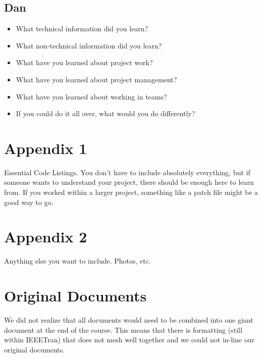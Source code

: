 \documentclass[compsoc,draftclsnofoot,onecolumn,10pt]{IEEEtran}
\begin{document}
\subsection{Dan}
\begin{itemize}
    \item What technical information did you learn?
    \item What non-technical information did you learn?
    \item What have you learned about project work?
    \item What have you learned about project management?
    \item What have you learned about working in teams?
    \item If you could do it all over, what would you do differently?
\end{itemize}

\section{Appendix 1}
Essential Code Listings. You don't have to include absolutely everything, but if someone wants to understand your project, there should be enough here to learn from. If you worked within a larger project, something like a patch file might be a good way to go.

\section{Appendix 2}
Anything else you want to include. Photos, etc.

\newpage
\section{Original Documents}
We did not realize that all documents would need to be combined into one giant document at the end of the course. This means that there is formatting (still within IEEETran) that does not mesh well together and we could not in-line our original documents.
\newpage


\end{document}
